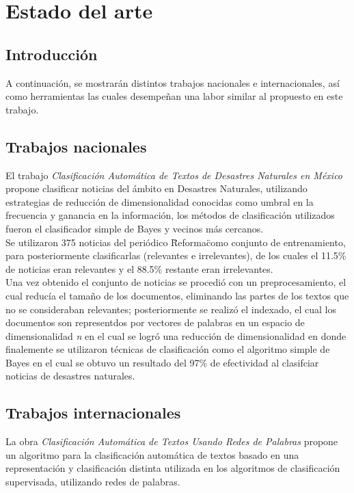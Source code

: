 
\chapter{Estado del arte}\label{chp:EstadoArte}

\section{Introducción}

	A continuación, se mostrarán distintos trabajos nacionales e internacionales, así como herramientas las cuales desempeñan una labor similar al propuesto en este trabajo.\\

\section{Trabajos nacionales}%

	El trabajo \textit{Clasificación Automática de Textos de Desastres Naturales en México}
	propone clasificar noticias del ámbito en Desastres Naturales, utilizando estrategias de reducción de dimensionalidad conocidas como umbral en la frecuencia y ganancia en la información, los métodos de clasificación utilizados fueron el clasificador simple de Bayes y vecinos más cercanos.\\

	Se utilizaron 375 noticias del periódico \"Reforma\" como conjunto de entrenamiento, para posteriormente clasificarlas (relevantes e irrelevantes), de los cuales el 11.5\% de noticias eran relevantes y el 88.5\% restante eran irrelevantes.\\

	Una vez obtenido el conjunto de noticias se procedió con un pre\-procesamiento, el cual reducía el tamaño de los documentos, eliminando las partes de los textos que no se consideraban relevantes; posteriormente se realizó el indexado, el cual los documentos son representdos por vectores de palabras en un espacio de dimensionalidad \textit{n} en el cual se logró una reducción de dimensionalidad en donde finalemente se utilizaron técnicas de clasificación como el algoritmo simple de Bayes en el cual se obtuvo un resultado del 97\% de efectividad al clasifciar noticias de desastres naturales.\\



\section{Trabajos internacionales}
	La obra \textit{Clasificación Automática de Textos Usando Redes de Palabras} propone un algoritmo para la clasificación automática de textos basado en una representación y clasificación distinta utilizada en los algoritmos de clasificación supervisada, utilizando redes de palabras.\\

